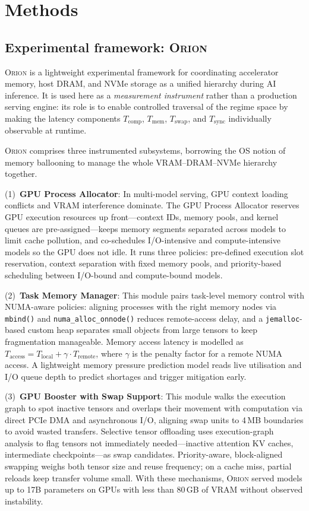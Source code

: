 \section*{Methods}
\label{sec:methods}

\subsection*{Experimental framework: \textsc{Orion}}

\textsc{Orion} is a lightweight experimental framework for coordinating
accelerator memory, host DRAM, and NVMe storage as a unified hierarchy during
AI inference.
It is used here as a \emph{measurement instrument} rather than a production
serving engine: its role is to enable controlled traversal of the regime space
by making the latency components $T_{\mathrm{comp}}$, $T_{\mathrm{mem}}$,
$T_{\mathrm{swap}}$, and $T_{\mathrm{sync}}$ individually observable at
runtime.

\textsc{Orion} comprises three instrumented subsystems, borrowing the OS notion
of memory ballooning to manage the whole VRAM--DRAM--NVMe hierarchy together.

(1)~\textbf{GPU Process Allocator}: In multi-model serving, GPU context loading
conflicts and VRAM interference dominate. The GPU Process Allocator reserves
GPU execution resources up front---context IDs, memory pools, and kernel queues
are pre-assigned---keeps memory segments separated across models to limit cache
pollution, and co-schedules I/O-intensive and compute-intensive models so the
GPU does not idle. It runs three policies: pre-defined execution slot
reservation, context separation with fixed memory pools, and priority-based
scheduling between I/O-bound and compute-bound models.

(2)~\textbf{Task Memory Manager}: This module pairs task-level memory control
with NUMA-aware policies: aligning processes with the right memory nodes via
\texttt{mbind()} and \texttt{numa\_alloc\_onnode()} reduces remote-access delay,
and a \texttt{jemalloc}-based custom heap separates small objects from large
tensors to keep fragmentation manageable. Memory access latency is modelled as
$T_{\mathrm{access}} = T_{\mathrm{local}} + \gamma \cdot T_{\mathrm{remote}}$,
where $\gamma$ is the penalty factor for a remote NUMA access. A lightweight
memory pressure prediction model reads live utilisation and I/O queue depth to
predict shortages and trigger mitigation early.

(3)~\textbf{GPU Booster with Swap Support}: This module walks the execution
graph to spot inactive tensors and overlaps their movement with computation via
direct PCIe DMA and asynchronous I/O, aligning swap units to 4\,MB boundaries
to avoid wasted transfers. Selective tensor offloading uses execution-graph
analysis to flag tensors not immediately needed---inactive attention KV caches,
intermediate checkpoints---as swap candidates. Priority-aware, block-aligned
swapping weighs both tensor size and reuse frequency; on a cache miss, partial
reloads keep transfer volume small. With these mechanisms, \textsc{Orion} served
models up to 17B parameters on GPUs with less than 80\,GB of VRAM without
observed instability.


